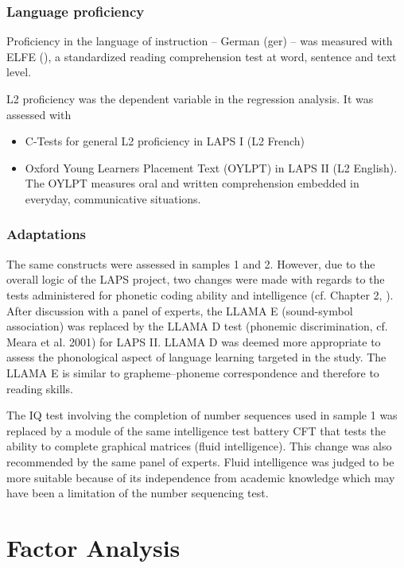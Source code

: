 \documentclass[output=paper]{langsci/langscibook}
\begin{document}
\subsubsection{Language proficiency}

Proficiency in the language of instruction – German (ger) – was measured with ELFE (\citealt{LenhardSchneider2006}), a standardized reading comprehension test at word, sentence and text level.

L2 proficiency was the dependent variable in the regression analysis. It was assessed with 

\begin{itemize}
\item C-Tests for general L2 proficiency in LAPS I (L2 French)
\item Oxford Young Learners Placement Text (OYLPT) \citep{Testing2013} in LAPS II (L2 English). The OYLPT measures oral and written comprehension embedded in everyday, communicative situations.
\end{itemize}
\subsubsection{Adaptations}

The same constructs were assessed in samples 1 and 2. However, due to the overall logic of the LAPS project, two changes were made with regards to the tests administered for phonetic coding ability and intelligence (cf. Chapter 2, ). After discussion with a panel of experts, the LLAMA E (sound-symbol association) was replaced by the LLAMA D test (phonemic discrimination, cf. Meara et al. 2001) for LAPS II. LLAMA D was deemed more appropriate to assess the phonological aspect of language learning targeted in the study. The LLAMA E is similar to grapheme–phoneme correspondence and therefore to reading skills.

The IQ test involving the completion of number sequences used in sample 1 was replaced by a module of the same intelligence test battery CFT \citep{Weiss2006} that tests the ability to complete graphical matrices (fluid intelligence). This change was also recommended by the same panel of experts. Fluid intelligence was judged to be more suitable because of its independence from academic knowledge which may have been a limitation of the number sequencing test. 

\section{Factor Analysis}
\end{document}
